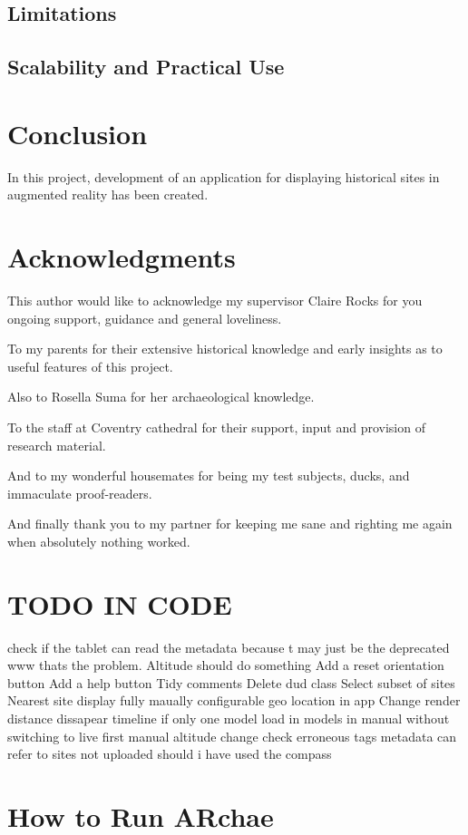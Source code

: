 \documentclass{article}
\begin{document}
\subsection{Limitations}
\subsection{Scalability and Practical Use}

\section{Conclusion}
In this project, development of an application for displaying historical sites in augmented reality has been created. 

\section{Acknowledgments}
This author would like to acknowledge my supervisor Claire Rocks for you ongoing support, guidance and general loveliness.

To my parents for their extensive historical knowledge and early insights as to useful features of this project.

Also to Rosella Suma for her archaeological knowledge.

To the staff at Coventry cathedral for their support, input and provision of research material.

And to my wonderful housemates for being my test subjects, ducks, and immaculate proof-readers.

And finally thank you to my partner for keeping me sane and righting me again when absolutely nothing worked. 

\section{TODO IN CODE}
check if the tablet can read the metadata because t may just be the deprecated www thats the problem.
Altitude should do something
Add a reset orientation button
Add a help button
Tidy comments
Delete dud class 
Select subset of sites
Nearest site display
fully maually configurable geo location in app
Change render distance
dissapear timeline if only one model
load in models in manual without switching to live first
manual altitude change
check erroneous tags
metadata can refer to sites not uploaded
should i have used the compass 



\appendix

\section{How to Run ARchae}
\end{document}
